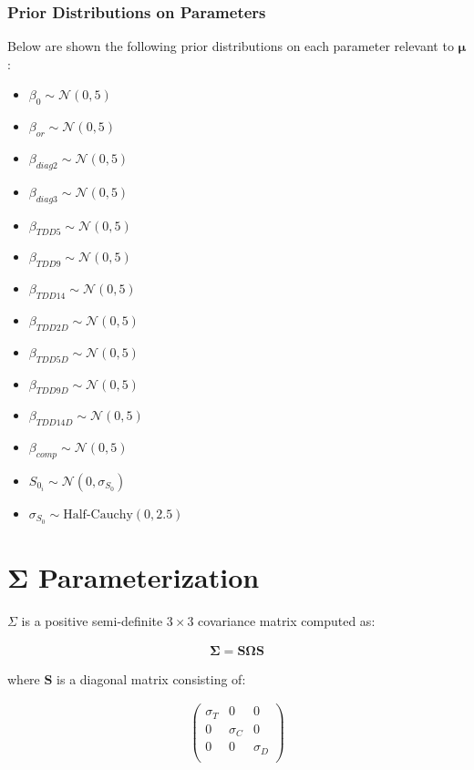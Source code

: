 \subsubsection{Prior Distributions on Parameters}
Below are shown the following prior distributions on each parameter relevant to $\boldsymbol{\mu}$:
\begin{itemize}
    \item $\beta_{0} \sim \mathcal{N}(0,5)$
    \item $\beta_{or} \sim \mathcal{N}(0,5)$
    \item $\beta_{diag2} \sim \mathcal{N}(0,5)$
    \item $\beta_{diag3} \sim \mathcal{N}(0,5)$
    \item $\beta_{TDD5} \sim \mathcal{N}(0,5)$
    \item $\beta_{TDD9} \sim \mathcal{N}(0,5)$
    \item $\beta_{TDD14} \sim \mathcal{N}(0,5)$
    \item $\beta_{TDD2D} \sim \mathcal{N}(0,5)$
    \item $\beta_{TDD5D} \sim \mathcal{N}(0,5)$
    \item $\beta_{TDD9D} \sim \mathcal{N}(0,5)$
    \item $\beta_{TDD14D} \sim \mathcal{N}(0,5)$
    \item $\beta_{comp} \sim \mathcal{N}(0,5)$
    \item $S_{0_i} \sim \mathcal{N}(0,\sigma_{S_0})$
    \item $\sigma_{S_0} \sim \text{Half-Cauchy}(0, 2.5)$
\end{itemize}

\section{\texorpdfstring{$\boldsymbol{\Sigma}$}{Sigma} Parameterization}
$\Sigma$ is a positive semi-definite $3 \times 3$ covariance matrix computed as:

\begin{align}
   \boldsymbol{\Sigma}=\bm{S}\boldsymbol{\Omega}\bm{S}
   \label{eqn:Sigma}
\end{align}

where $\bm{S}$ is a diagonal matrix consisting of: 

\begin{align}
   \begin{pmatrix}
      \sigma_{T} & 0 & 0 \\
      0 & \sigma_{C} & 0 \\
      0 & 0 & \sigma_{D} \\
   \end{pmatrix}
   \label{eqn:S_1}
\end{align}


